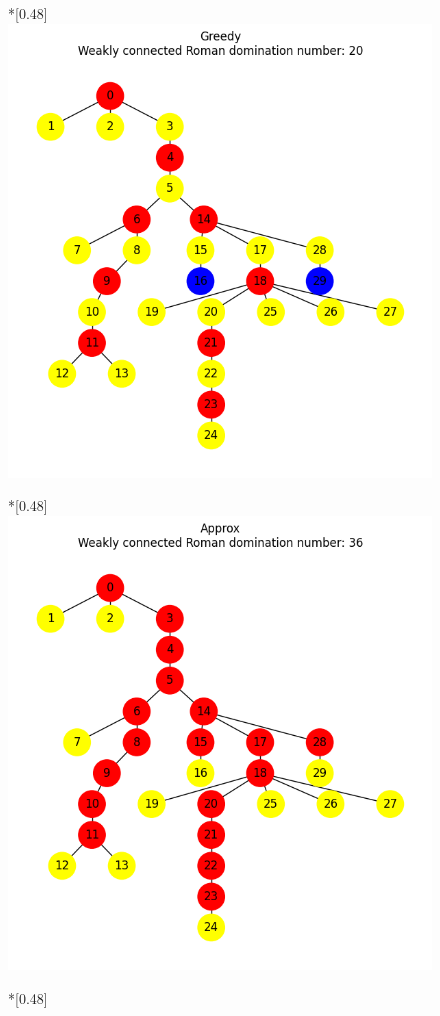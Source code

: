 \begin{figure}[H]
        \begin{subcaptionbox}*{}[0.48\linewidth]
            {\includegraphics[width=0.75\linewidth]{assets/plots/Greedy/RandomTree_n30_i2_results.png}}
        \end{subcaptionbox}
        \hfill
        \begin{subcaptionbox}*{}[0.48\linewidth]
            {\includegraphics[width=0.75\linewidth]{assets/plots/Approx/RandomTree_n30_i2_results.png}}
        \end{subcaptionbox}
        \hfill
        \begin{subcaptionbox}*{}[0.48\linewidth]

\end{subcaptionbox}
\end{figure}
